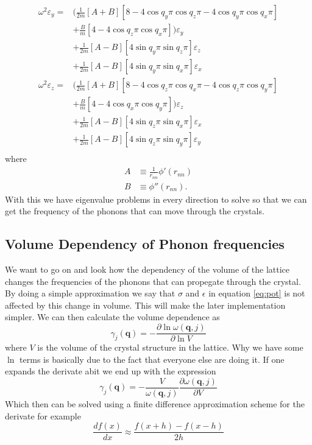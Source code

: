 \documentclass[11pt]{article}
\begin{document}
\begin{align}
	\omega^2\varepsilon_y = &\big( \frac{1}{2m} [A+B][8-4\cos{q_y\pi}\cos{q_z\pi}-4\cos{q_y\pi}\cos{q_x\pi}] \\
	&+ \frac{B}{m}[4-4\cos{q_z\pi}\cos{q_x\pi}]\big)\varepsilon_y \\
	&+\frac{1}{2m}[A-B][4\sin{q_y\pi}\sin{q_z\pi}]\varepsilon_z \\
	&+\frac{1}{2m}[A-B][4\sin{q_y\pi}\sin{q_x\pi}]\varepsilon_x \\
	\omega^2\varepsilon_z = &\big( \frac{1}{2m} [A+B][8-4\cos{q_z\pi}\cos{q_x\pi}-4\cos{q_z\pi}\cos{q_y\pi}] \\
	&+ \frac{B}{m}[4-4\cos{q_x\pi}\cos{q_y\pi}]\big)\varepsilon_z \\
	&+\frac{1}{2m}[A-B][4\sin{q_z\pi}\sin{q_x\pi}]\varepsilon_x \\
	&+\frac{1}{2m}[A-B][4\sin{q_z\pi}\sin{q_y\pi}]\varepsilon_y \\
	\label{eq:omegaRest}
\end{align}
where
\begin{align}
	A &\equiv \frac{1}{r_{nn}} \phi'(r_{nn}) \\
	B &\equiv \phi''(r_{nn}).
	\label{eq:AB}
\end{align}
With this we have eigenvalue problems in every direction to solve so that we can get the frequency of the phonons that can move through the crystals. 
\subsection{Volume Dependency of Phonon frequencies}
We want to go on and look how the dependency of the volume of the lattice changes the frequencies of the phonons that can propegate through the crystal. By doing a simple approximation we say that $\sigma$ and $\epsilon$ in equation \ref{eq:pot} is not affected by this change in volume. This will make the later implementation simpler. We can then calculate the volume dependence as 
\begin{equation}
	\gamma_j(\mathbf{q}) = - \frac{\partial \ln{ \omega(\mathbf{q},j)}}{\partial \ln{V}}
\end{equation}
where $V$ is the volume of the crystal structure in the lattice. Why we have some $\ln$ terms is basically due to the fact that everyone else are doing it. If one expands the derivate abit we end up with the  expression
\begin{equation}
	\gamma_j(\mathbf{q}) =  -\frac{V}{\omega(\mathbf{q},j)} \frac{\partial \omega(\mathbf{q},j)}{\partial V}
\end{equation}
Which then can be solved using a finite difference approximation scheme for the derivate for example
\begin{equation}
	\frac{df(x)}{dx} \approx \frac{f(x+h)-f(x-h)}{2h}
\end{equation}
\end{document}
